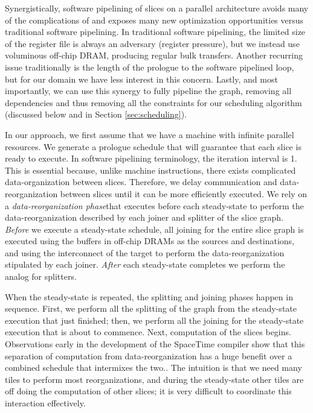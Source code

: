 Synergistically, software pipelining of slices on a parallel
architecture avoids many of the complications of and exposes many new
optimization opportunities versus traditional software pipelining.  In
traditional software pipelining, the limited size of the register file
is always an adversary (register pressure), but we instead use
voluminous off-chip DRAM, producing regular bulk transfers.  Another
recurring issue traditionally is the length of the prologue to the
software pipelined loop, but for our domain we have less interest in
this concern.  Lastly, and most importantly, we can use this synergy
to fully pipeline the graph, removing all dependencies and thus
removing all the constraints for our scheduling algorithm (discussed
below and in Section \ref{sec:scheduling}).

In our approach, we first assume that we have a machine with infinite
parallel resources.  We generate a prologue schedule that will
guarantee that each slice is ready to execute.  In software pipelining
terminology, the iteration interval is 1.  This is essential because,
unlike machine instructions, there exists complicated
data-organization between slices. Therefore, we delay communication
and data-reorganization between slices until it can be more
efficiently executed.  We rely on a {\it data-reorganization
phase}that executes before each steady-state to perform the
data-reorganization described by each joiner and splitter of the slice
graph.  {\it Before} we execute a steady-state schedule, all joining
for the entire slice graph is executed using the buffers in off-chip
DRAMs as the sources and destinations, and using the interconnect of
the target to perform the data-reorganization stipulated by each
joiner.  {\it After} each steady-state completes we perform the analog
for splitters.

When the steady-state is repeated, the splitting and joining phases
happen in sequence.  First, we perform all the splitting of the graph
from the steady-state execution that just finished; then, we perform
all the joining for the steady-state execution that is about to
commence. Next, computation of the slices begins.  Observations early
in the development of the SpaceTime compiler show that this separation
of computation from data-reorganization has a huge benefit over a
combined schedule that intermixes the two..  The intuition is that we
need many tiles to perform most reorganizations, and during the
steady-state other tiles are off doing the computation of other
slices; it is very difficult to coordinate this interaction
effectively.

